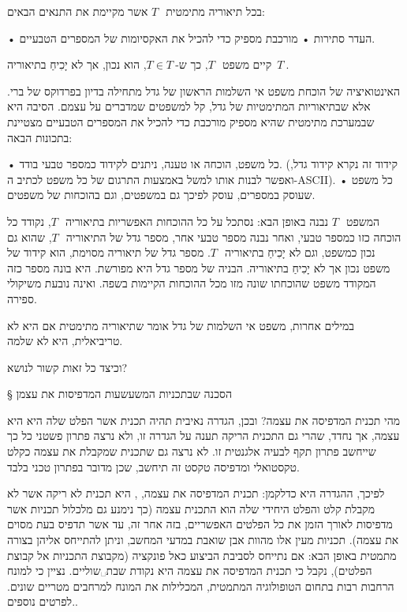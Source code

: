 \begin{mybox}
בכל תיאוריה מתימטית~$ T~$ אשר מקיימת את התנאים הבאים:
\begin{itemize}
• העדר סתירות
• מורכבת מספיק כדי להכיל את האקסיומות של המספרים הטבעיים.
\end{itemize}
קיים משפט~$ T~$, כך ש-$ T∈T~$, הוא נכון, אך לא יָכִיחַ בתיאוריה~$ T~$.
\end{mybox}
האינטואיציה של הוכחת משפט אי השלמות הראשון של גדל מתחילה בדיון בפרדוקס של ברי. אלא שבתיאוריות המתימטיות של גדל, קל למשפטים שמדברים על עצמם. הסיבה היא שבמערכת מתימטית שהיא מספיק מורכבת כדי להכיל את המספרים הטבעיים מצטיינת בתכונות הבאה:
\begin{itemize}
• כל משפט, הוכחה או טענה, ניתנים לקידוד כמספר טבעי בודד. (קידוד זה נקרא קידוד גדל, ואפשר לבנות אותו למשל באמצעות התרגום של כל משפט לכתיב ה-ASCII).
• כל משפט שעוסק במספרים, עוסק לפיכך גם במשפטים, וגם בהוכחות של משפטים.
\end{itemize}
 המשפט~$ T~$ נבנה באופן הבא: נסתכל על כל ההוכחות האפשריות בתיאוריה~$ T~$, נקודד כל הוכחה כזו כמספר טבעי, ואחר נבנה מספר טבעי אחר, מספר גדל של התיאוריה~$ T~$, שהוא גם נכון כמשפט, וגם לא יָכִיחַ בתיאוריה~$ T~$. מספר גדל של תיאוריה מסוימת, הוא קידוד של משפט נכון אך לא יָכִיחַ בתיאוריה. הבניה של מספר גדל היא מפורשת. היא בונה מספר כזה המקודד משפט שהוכחתו שונה מזו מכל ההוכחות הקיימות בשפה. ואינה נובעת משיקולי ספירה.

 במילים אחרות, משפט אי השלמות של גדל אומר שתיאוריה מתימטית אם היא לא טריביאלית, היא לא שלמה.

וכיצד כל זאות קשור לנושא?
\newpage

§ הסכנה שבתכניות המשעשעות המדפיסות את עצמן

מהי תכנית המדפיסה את עצמה? ובכן, הגדרה נאיבית תהיה תכנית אשר הפלט שלה היא היא עצמה, אך נחדד, שהרי גם התכנית הריקה תענה על הגדרה זו, ולא נרצה פתרון פשטני כל כך שייחשב פתרון תקף לבעיה אלגנטית זו. לא נרצה גם שתכנית שמקבלת את עצמה כקלט טקסטואלי ומדפיסה טקסט זה תיחשב, שכן מדובר בפתרון טכני בלבד.

לפיכך, ההגדרה היא כדלקמן: תכנית המדפיסה את עצמה, , היא תכנית לא ריקה אשר לא מקבלת קלט והפלט היחידי שלה הוא התכנית עצמה (כך נימנע גם מלכלול תכניות אשר מדפיסות לאורך הזמן את כל הפלטים האפשריים, בזה אחר זה, עד אשר תדפיס בעת מסוים את עצמה). תכניות מעין אלו מהוות אבן שואבת במדעי המחשב, וניתן להתייחס אליהן בצורה מתמטית באופן הבא: אם נתייחס לסביבת הביצוע כאל פונקציה (מקבוצת התכניות אל קבוצת הפלטים), נקבל כי תכנית המדפיסה את עצמה היא נקודת שבת␣שוליים{. נציין כי למונח הרחבות רבות בתחום הטופולוגיה המתמטית, המכלילות את המונח למרחבים מטריים שונים. לפרטים נוספים.}.

